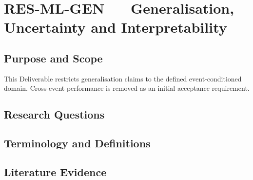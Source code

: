 
\section{RES-ML-GEN --- Generalisation, Uncertainty and Interpretability}
\label{sec:res-ml-gen}

\subsection{Purpose and Scope}
\label{sec:res-ml-gen-purpose}

This Deliverable restricts generalisation claims to the defined
event-conditioned domain. Cross-event performance is removed as an initial
acceptance requirement.

\subsection{Research Questions}
\label{sec:res-ml-gen-research-questions}


\subsection{Terminology and Definitions}
\label{sec:res-ml-gen-definitions}


\subsection{Literature Evidence}
\label{sec:res-ml-gen-literature-evidence}

%

